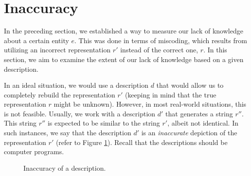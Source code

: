 %
%

\section{Inaccuracy}
\label{sec:introduction:inaccuracy}

In the preceding section, we established a way to measure our lack of knowledge about a certain entity $e$. This was done in terms of miscoding, which results from utilizing an incorrect representation $r'$ instead of the correct one, $r$. In this section, we aim to examine the extent of our lack of knowledge based on a given description. 

In an ideal situation, we would use a description $d$ that would allow us to completely rebuild the representation $r'$ (keeping in mind that the true representation $r$ might be unknown). However, in most real-world situations, this is not feasible. Usually, we work with a description $d'$ that generates a string $r''$. This string $r''$ is expected to be similar to the string $r'$, albeit not identical. In such instances, we say that the description $d'$ is an \emph{inaccurate} depiction of the representation $r'$ (refer to Figure \ref{fig:inaccuracy:inaccuracy:inaccuracy}). Recall that the descriptions should be computer programs.

\begin{figure}[t]
\centering
{}
\caption{\label{fig:inaccuracy:inaccuracy:inaccuracy}Inaccuracy of a description.}
\end{figure}

